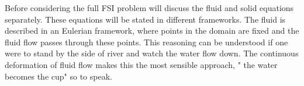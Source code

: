 Before considering the full FSI problem will discuss the fluid and solid equations separately. These equations will be stated in different frameworks. The fluid is described in an Eulerian framework, where points in the domain are fixed and the fluid flow passes through these points. This reasoning can be understood if one were to stand by the side of river and watch the water flow down. The continuous deformation of fluid flow makes this the most sensible approach, " the water becomes the cup" so to speak.